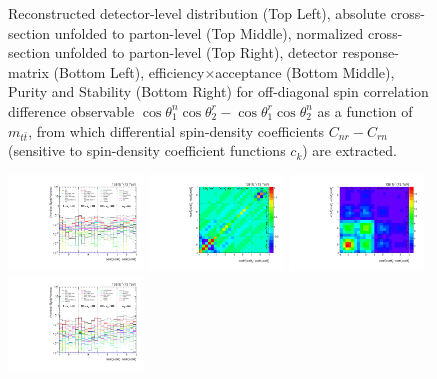 \begin{refsection}
\begin{figure}[htb]
\begin{center}
\caption{Reconstructed detector-level distribution (Top Left), absolute cross-section unfolded to parton-level (Top Middle), normalized cross-section unfolded to parton-level (Top Right), detector response-matrix (Bottom Left), efficiency$\times$acceptance (Bottom Middle), Purity and Stability (Bottom Right) for off-diagonal spin correlation difference observable $\cos\theta_{1}^{n}\cos\theta_{2}^{r}-\cos\theta_{1}^{r}\cos\theta_{2}^{n}$ as a function of $m_{t\bar{t}}$, from which differential spin-density coefficients $C_{nr}-C_{rn}$ (sensitive to spin-density coefficient functions $c_k$) are extracted.}
\label{fig:c_Mnr_mttbar}
\end{center}
\end{figure}
\clearpage
\begin{figure}[htb]
\begin{center}
 \includegraphics[width=0.32\textwidth]{fig_fullRun2UL/unfolding/combined/deltaSystCombinedlog_rebinnedB_c_Mnr_mttbar.pdf}
 \includegraphics[width=0.32\textwidth]{fig_fullRun2UL/unfolding/combined/StatCovMatrix_rebinnedB_c_Mnr_mttbar.pdf}
 \includegraphics[width=0.32\textwidth]{fig_fullRun2UL/unfolding/combined/TotalSystCovMatrix_rebinnedB_c_Mnr_mttbar.pdf} \\
 \includegraphics[width=0.32\textwidth]{fig_fullRun2UL/unfolding/combined/deltaSystCombinedlogNorm_rebinnedB_c_Mnr_mttbar.pdf}

\end{center}
\end{figure}
\end{refsection}
